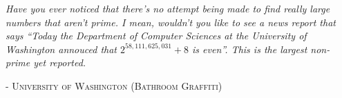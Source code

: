 \documentclass[landscape,handout]{powersem} %
\newcommand{\heading}[1]{%
 \begin{center}
  \large\bf
  \shadowbox{{\textcolor{conceptcolor}{#1}}}%
 \end{center}
 \vspace{1ex minus 1ex}}
\begin{document}
\begin{slide}
\heading{Another quotation!!!}\bigskip\bigskip\bigskip

\textit{
Have you ever noticed that there's no attempt being made to find really
large numbers that aren't prime. I mean, wouldn't you like to see a 
news report that says ``Today the Department of Computer Sciences at the
University of Washington annouced that $2^{58,111,625,031}+8$ is even''.
This is the largest non-prime yet reported.}\bigskip

\textsc{- University of Washington (Bathroom Graffiti)
}
\end{slide}
\end{document}
